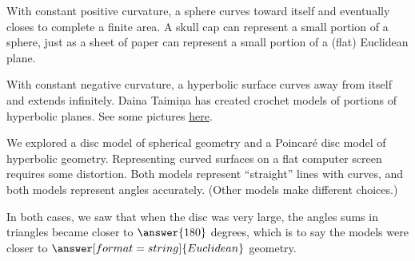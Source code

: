 \documentclass{ximera}
\begin{document}
\begin{problem}
With constant positive curvature, a sphere curves toward itself and eventually closes to complete a finite area.  A skull cap can represent a small portion of a sphere, just as a sheet of paper can represent a small portion of a (flat) Euclidean plane.  

With constant negative curvature, a hyperbolic surface curves away from itself and extends infinitely.  Daina Taimi\c{n}a has created crochet models of portions of hyperbolic planes.  See some pictures \href{https://www.theiff.org/oexhibits/oe1e.html}{here}.  

We explored a disc model of spherical geometry and a Poincaré disc model of hyperbolic geometry.  Representing curved surfaces on a flat computer screen requires some distortion.  Both models represent ``straight'' lines with curves, and both models represent angles accurately.  (Other models make different choices.)

In both cases, we saw that when the disc was very large, the angles sums in triangles became closer to $\answer{180}$ degrees, which is to say the models were closer to $\answer[format=string]{Euclidean}$ geometry.  
\end{problem}
\end{document}
